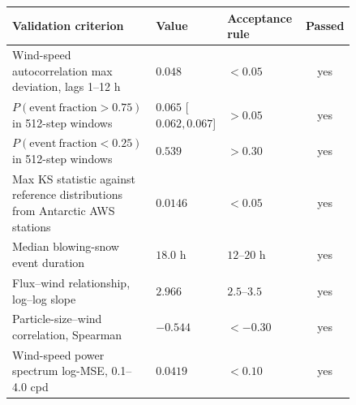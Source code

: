 \setlength{\tabcolsep}{3.5pt}
\begin{tabular}{@{}>{\raggedright\arraybackslash}p{0.43\linewidth}>{\raggedright\arraybackslash}p{0.17\linewidth}>{\raggedright\arraybackslash}p{0.24\linewidth}c@{}}
\toprule
Validation criterion & Value & Acceptance rule & Passed \\
\midrule
Wind-speed autocorrelation max deviation, lags 1--12 h & $0.048$ & $<0.05$ & yes \\
$P(\mathrm{event\ fraction}>0.75)$ in 512-step windows & $0.065$ [$0.062,0.067$] & $>0.05$ & yes \\
$P(\mathrm{event\ fraction}<0.25)$ in 512-step windows & $0.539$ & $>0.30$ & yes \\
Max KS statistic against reference distributions from Antarctic AWS stations & $0.0146$ & $<0.05$ & yes \\
Median blowing-snow event duration & $18.0$ h & $12$--$20$ h & yes \\
Flux--wind relationship, log--log slope & $2.966$ & $2.5$--$3.5$ & yes \\
Particle-size--wind correlation, Spearman & $-0.544$ & $<-0.30$ & yes \\
Wind-speed power spectrum log-MSE, 0.1--4.0 cpd & $0.0419$ & $<0.10$ & yes \\
\bottomrule
\end{tabular}
